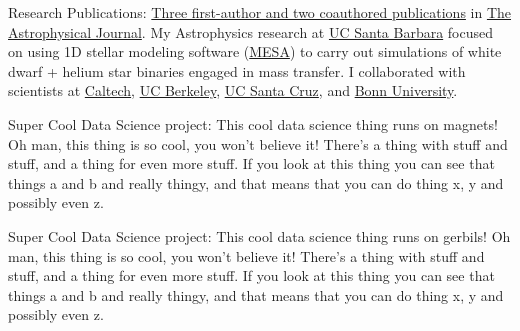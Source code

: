 \documentclass[10pt]{article} %
\begin{document}
\jobb
{Research Publications:}
{\href{http://adsabs.harvard.edu/cgi-bin/nph-abs_connect?library&libname=MyPapers&libid=561872b258}{Three first-author and two coauthored publications} in \href{http://iopscience.iop.org/journal/0004-637X}{The Astrophysical Journal}.}
{My Astrophysics research at \href{http://www.ucsb.edu}{UC Santa Barbara} focused on using 1D stellar modeling software (\href{http://mesa.sourceforge.net/}{MESA}) to carry out simulations of white dwarf + helium star binaries engaged in mass transfer. I collaborated with scientists at \href{https://www.caltech.edu/}{Caltech}, \href{www.berkeley.edu/}{UC Berkeley}, \href{https://www.ucsc.edu}{UC Santa Cruz}, and \href{https://www.uni-bonn.de/}{Bonn University}.}%


\jobb
{Super Cool Data Science project:}
{This cool data science thing runs on magnets!}
{Oh man, this thing is so cool, you won't believe it! There's a thing with stuff and stuff, and a thing for even more stuff. If you look at this thing you can see that things a and b and really thingy, and that means that you can do thing x, y and possibly even z.}



\jobb
{Super Cool Data Science project:}
{This cool data science thing runs on gerbils!}
{Oh man, this thing is so cool, you won't believe it! There's a thing with stuff and stuff, and a thing for even more stuff. If you look at this thing you can see that things a and b and really thingy, and that means that you can do thing x, y and possibly even z.}

\end{document}
